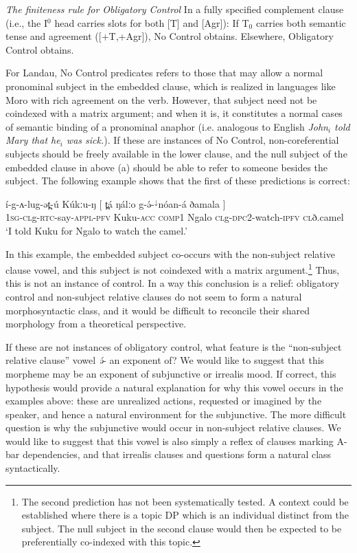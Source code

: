 \ea \textit{The finiteness rule for Obligatory Control}  \citep{landau13}  \label{ocrule}
In a fully specified complement clause (i.e., the I$^0$ head carries slots for both [T] and [Agr]):
\ea  If T$_0$ carries both semantic tense and agreement ([+T,+Agr]), No Control obtains.
\ex Elsewhere, Obligatory Control obtains.
\z
\z  

For Landau, No Control predicates refers to those that may allow a normal pronominal subject in the embedded clause, which is realized in languages like Moro with rich agreement on the verb. However, that subject need not be coindexed with a matrix argument; and when it is, it constitutes a normal cases of semantic binding of a pronominal anaphor (i.e. analogous to English \textit{John$_i$ told Mary that he$_i$ was sick.}). If these are instances of No Control, non-coreferential subjects should be freely available in the lower clause, and the null subject of the embedded clause in above (a) should be able to refer to someone besides the subject. The following example shows that the first of these predictions is correct:

\ea \gll í-g-ʌ-lug-ət̪-ú Kúkːu-ŋ  $[$ t̪á ŋálːo g-ə́-$^{↓}$nóan-á ðamala $]$\\
\textsc{1sg-cl}g-\textsc{rtc}-say-\textsc{appl}-\textsc{pfv} Kuku-\textsc{acc} {} \textsc{comp1} Ngalo \textsc{cl}g-\textsc{dpc2}-watch-\textsc{ipfv} \textsc{cl}ð.camel {}\\
\glt ‘I told Kuku for Ngalo to watch the camel.’
\z 

In this example, the embedded subject co-occurs with the non-subject relative clause vowel, and this subject is not coindexed with a matrix argument.\footnote{The second prediction has not been systematically tested. A context could be established where there is a topic DP which is an individual distinct from the subject. The null subject in the second clause would then be expected to be preferentially co-indexed with this topic.} Thus, this is not an instance of control. In a way this conclusion is a relief: obligatory control and non-subject relative clauses do not seem to form a natural morphosyntactic class, and it would be difficult to reconcile their shared morphology from a theoretical perspective.

If these are not instances of obligatory control, what feature is the ``non-subject relative clause'' vowel \textit{ə́}- an exponent of? We would like to suggest that this morpheme may be an exponent of subjunctive or irrealis mood. If correct, this hypothesis would provide a natural explanation for why this vowel occurs in the examples above: these are unrealized actions, requested or imagined by the speaker, and hence a natural environment for the subjunctive.  The more difficult question is why the subjunctive would occur in non-subject relative clauses. We would like to suggest that this vowel is also simply a reflex of clauses marking A-bar dependencies, and that irrealis clauses and questions form a natural class syntactically.


